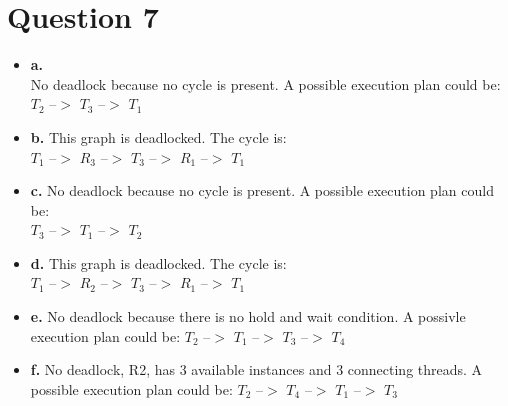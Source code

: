 \documentclass[11pt]{article}
\begin{document}
\section*{Question 7}
\begin{itemize}
    \item \textbf{a.}\\
        No deadlock because no cycle is present. A possible execution 
        plan could be:\\ 
        $T_2$ --$>$ $T_3$ --$>$ $T_1$
    \item \textbf{b.}
        This graph is deadlocked. The cycle is:\\ 
        $T_1$ --$>$ $R_3$ --$>$ $T_3$ --$>$ $R_1$ --$>$ $T_1$
    \item \textbf{c.}
        No deadlock because no cycle is present. A possible execution 
        plan could be:\\ 
        $T_3$ --$>$ $T_1$ --$>$ $T_2$
    \item \textbf{d.}
        This graph is deadlocked. The cycle is:\\
         $T_1$ --$>$ $R_2$ --$>$ $T_3$ --$>$ $R_1$ --$>$ $T_1$
    \item \textbf{e.}
        No deadlock because there is no hold and wait condition.
        A possivle execution plan could be: 
        $T_2$ --$>$ $T_1$ --$>$ $T_3$ --$>$ $T_4$
    \item \textbf{f.}
        No deadlock, R2, has 3 available instances and 
        3 connecting threads. A possible execution plan could 
        be: 
        $T_2$ --$>$ $T_4$ --$>$ $T_1$ --$>$ $T_3$
\end{itemize}
\end{document}
